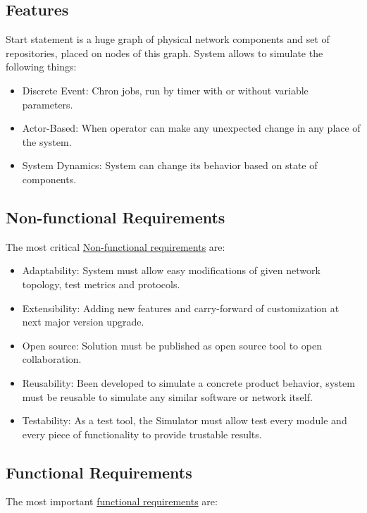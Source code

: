 \documentclass[12pt,oneside]{article}
\begin{document}
\subsection{Features}
\label{sec:features}
Start statement is a huge graph of physical network components and set of repositories, placed on nodes of this graph. System allows to simulate the following things:
\begin{itemize}
    \item Discrete Event: Chron jobs, run by timer with or without variable parameters.
    \item Actor-Based: When operator can make any unexpected change in any place of the system.
    \item System Dynamics: System can change its behavior based on state of components.
\end{itemize}

\subsection{Non-functional Requirements}
\label{sec:nfr}
The most critical
\href{https://en.wikipedia.org/wiki/Non-functional_requirement}{Non-functional requirements}
are:
\begin{itemize}
    \item Adaptability: System must allow easy modifications of given network topology, test metrics and protocols.
    \item Extensibility: Adding new features and carry-forward of customization at next major version upgrade.
    \item Open source: Solution must be published as open source tool to open collaboration.
    \item Reusability: Been developed to simulate a concrete product behavior, system must be reusable to simulate any similar software or network itself.
    \item Testability: As a test tool, the Simulator must allow test every module and every piece of functionality to provide trustable results.
\end{itemize}

\subsection{Functional Requirements}
\label{sec:fr}

The most important \href{https://en.wikipedia.org/wiki/Functional_requirement}{functional requirements} are:
\end{document}
